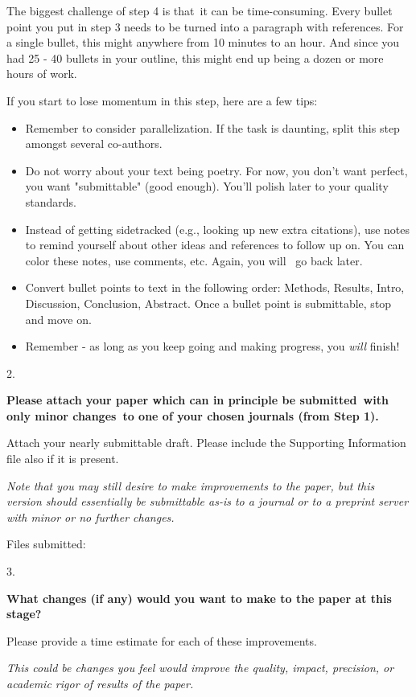 \documentclass[]{article}
\begin{document}
The biggest challenge of step 4 is that~it can be time-consuming. Every
bullet point you put in step 3 needs to be turned into a paragraph with
references. For a single bullet, this might anywhere from 10 minutes to
an hour. And since you had 25 - 40 bullets in your outline, this might
end up being a dozen or more hours of work.

If you start to lose momentum in this step, here are a few tips:

\begin{itemize}
\item
  Remember to consider parallelization. If the task is daunting, split
  this step amongst several co-authors.
\item
  Do not worry about your text being poetry. For now, you don't want
  perfect, you want "submittable" (good enough). You'll polish later to
  your quality standards.
\item
  Instead of getting sidetracked (e.g., looking up new extra citations),
  use notes to remind yourself about other ideas and references to
  follow up on. You can color these notes, use comments, etc. Again, you
  will ~go back later.
\item
  Convert bullet points to text in the following order: Methods,
  Results, Intro, Discussion, Conclusion, Abstract. Once a bullet point
  is submittable, stop and move on.
\item
  Remember - as long as you keep going and making progress, you
  \emph{will} finish!
\end{itemize}

2.

\textbf{Please attach your paper which can in principle be
submitted~with only minor changes~to one of your chosen journals (from
Step 1).}

Attach your nearly submittable draft. Please include the Supporting
Information file also if it is present.

\emph{Note that you may still desire to make improvements to the paper,
but this version should essentially be submittable as-is to a journal or
to a preprint server with minor or no further changes.}

Files submitted:

3.

\textbf{What changes (if any) would you want to make to the paper at
this stage?}

Please provide a time estimate for each of these improvements.

\emph{This could be changes you feel would improve the quality, impact,
precision, or academic rigor of results of the paper.}
\end{document}
